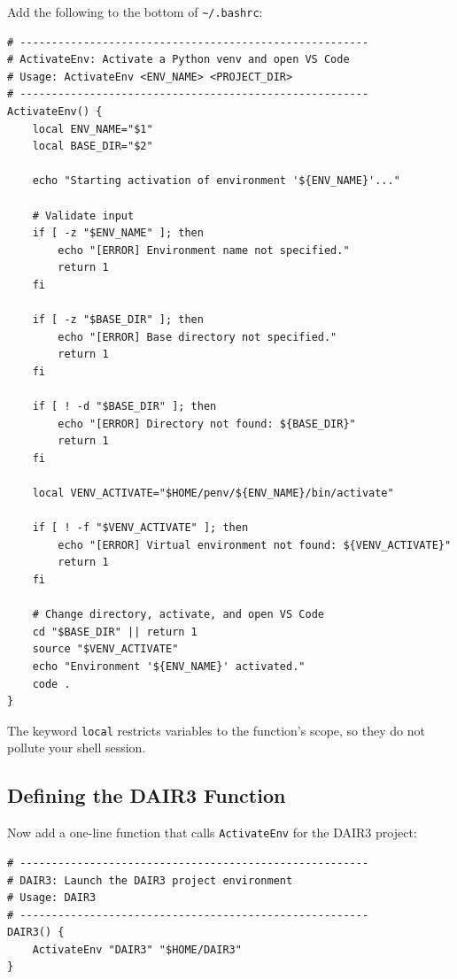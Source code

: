 Add the following to the bottom of \texttt{\textasciitilde/.bashrc}:

\begin{lstlisting}[style=linuxStyle, basicstyle=\footnotesize\ttfamily, caption={Shell function version of \texttt{ActivateEnv} in \textasciitilde/.bashrc}]
# -------------------------------------------------------
# ActivateEnv: Activate a Python venv and open VS Code
# Usage: ActivateEnv <ENV_NAME> <PROJECT_DIR>
# -------------------------------------------------------
ActivateEnv() {
    local ENV_NAME="$1"
    local BASE_DIR="$2"

    echo "Starting activation of environment '${ENV_NAME}'..."

    # Validate input
    if [ -z "$ENV_NAME" ]; then
        echo "[ERROR] Environment name not specified."
        return 1
    fi

    if [ -z "$BASE_DIR" ]; then
        echo "[ERROR] Base directory not specified."
        return 1
    fi

    if [ ! -d "$BASE_DIR" ]; then
        echo "[ERROR] Directory not found: ${BASE_DIR}"
        return 1
    fi

    local VENV_ACTIVATE="$HOME/penv/${ENV_NAME}/bin/activate"

    if [ ! -f "$VENV_ACTIVATE" ]; then
        echo "[ERROR] Virtual environment not found: ${VENV_ACTIVATE}"
        return 1
    fi

    # Change directory, activate, and open VS Code
    cd "$BASE_DIR" || return 1
    source "$VENV_ACTIVATE"
    echo "Environment '${ENV_NAME}' activated."
    code .
}
\end{lstlisting}

The keyword \texttt{local} restricts variables to the function's scope,
so they do not pollute your shell session.

\subsection{Defining the DAIR3 Function}

Now add a one-line function that calls \texttt{ActivateEnv} for the
DAIR3 project:

\begin{lstlisting}[style=linuxStyle, caption={Project-specific function for DAIR3 in \textasciitilde/.bashrc}]
# -------------------------------------------------------
# DAIR3: Launch the DAIR3 project environment
# Usage: DAIR3
# -------------------------------------------------------
DAIR3() {
    ActivateEnv "DAIR3" "$HOME/DAIR3"
}
\end{lstlisting}

